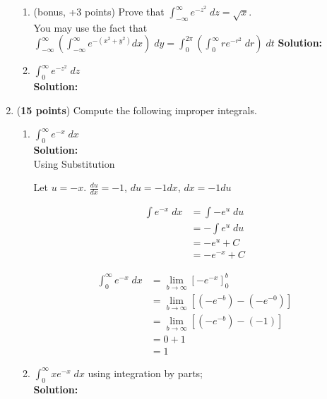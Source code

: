 \documentclass[a4paper]{article}
\begin{document}
\begin{enumerate}
\begin{enumerate}
	
	\item (bonus, +3 points) Prove that $\int_{-\infty}^\infty e^{-z^2} \; dz = \sqrt{x}$.\\You may use the fact that $\int_{-\infty}^\infty(\int_{-\infty}^\infty e^{-(x^2 + y^2)}dx) \; dy = \int_0^{2\pi}(\int_0^\infty re^{-r^2} \; dr)\; dt$
	\textbf{Solution:}\\
	
	\item $\int_0^\infty e^{-z^2} \; dz$\\
	\textbf{Solution:}\\	


	
\end{enumerate}



\item (\textbf{15 points}) Compute the following improper integrals.


\begin{enumerate}
	\item $\int_0^\infty e^{-x} \; dx$\\
	\textbf{Solution:}\\

Using Substitution

Let $u = -x$. $\frac{du}{dx} = - 1$, $du = -1dx$, $dx = -1du$

\begin{align*}
\int e^{-x} \; dx &= \int -e^u \; du\\
&= - \int e^u \; du\\
&= - e^u + C\\
&= -e^{-x} + C
\end{align*}

\begin{align*}
\int_0^\infty e^{-x} \; dx &= \lim_{b \to \infty}\left[ - e^{-x} \right]_0^b\\
&= \lim_{b \to \infty}\left[ (-e^{-b})-(-e^{-0}) \right]\\
&= \lim_{b \to \infty}\left[ (-e^{-b})-(-1) \right]\\
&= 0 + 1\\
&= 1
\end{align*}
	
	\item $\int_0^\infty xe^{-x} \; dx$ using integration by parts;\\
	\textbf{Solution:}\\	


\end{enumerate}
\end{enumerate}
\end{document}
